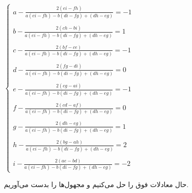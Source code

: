  $
 \begin{cases}
 	 a - \frac{2(ei-fh)}{a(ei-fh)-b(di-fg)+(dh-eg)} = -1 \\ \\
 	b - \frac{2(ch-bi)}{a(ei-fh)-b(di-fg)+(dh-eg)} = 1 \\ \\ 
 	c - \frac{2(bf-ce)}{a(ei-fh)-b(di-fg)+(dh-eg)} = -1 \\ \\
 	d - \frac{2(fg-di)}{a(ei-fh)-b(di-fg)+(dh-eg)} = 0 \\ \\ 
 	e - \frac{2(cg-ai)}{a(ei-fh)-b(di-fg)+(dh-eg)} = -1 \\ \\ 
 	f - \frac{2(cd-af)}{a(ei-fh)-b(di-fg)+(dh-eg)} = 0 \\ \\ 
 	g - \frac{2(dh-eg)}{a(ei-fh)-b(di-fg)+(dh-eg)} = 1 \\ \\ 
 	h - \frac{2(bg-ah)}{a(ei-fh)-b(di-fg)+(dh-eg)} = 2 \\ \\
 	i - \frac{2(ae-bd)}{a(ei-fh)-b(di-fg)+(dh-eg)} = -2
 	\end{cases}
 $
 
 
 \setRTL
 
 حال معادلات فوق را حل می‌کنیم و مجهول‌ها را بدست می‌آوریم.